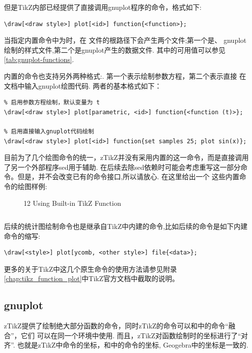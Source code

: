 但是TikZ内部已经提供了直接调用gnuplot程序的命令，格式如下:
\begin{verbatim}
\draw[<draw style>] plot[<id>] function{<function>};
\end{verbatim}

当指定内置命令中为时，在 文件的根路径下会产生两个文件;第一个是、
gnuplot绘制的样式文件,第二个是gnuplot产生的数据文件.
其中的可用值可以参见\cref{tab:gnuplot-functions}. 

内置的命令也支持另外两种格式:. 第一个表示绘制参数方程，第二个表示直接
在文档中输入gnuplot绘图代码. 两者的基本格式如下：
\begin{verbatim}
% 启用参数方程绘制，默认变量为 t
\draw[<draw style>] plot[parametric, <id>] function{<function (t)>};

% 启用直接输入gnuplot代码绘制
\draw[<draw style>] plot[<id>] function{set samples 25; plot sin(x)};
\end{verbatim}

目前为了几个绘图命令的统一，zTikZ并没有采用内置的这一命令，而是直接调用了另一个外部程序sed用于辅助.
在后续去除sed依赖时可能会考虑重写这一部分命令。但是，并不会改变已有的命令接口,所以请放心. 在这里给出一个
这些内置命令的绘图样例:

\begin{figure}[!htb]
    \centering
    
    \caption{12 Using Built-in TikZ Function}
    \label{fig:12-inverse-function-2}
\end{figure}

\inputminted{latex}{./Example/example_12.tex}

后续的统计图绘制命令也是继承自TikZ中内建的命令,比如后续的\cmd{\BarPlot}命令是如下内建命令的缩写:
\begin{verbatim}
\draw[<style>] plot[ycomb, <other style>] file{<data>};
\end{verbatim}

更多的关于TikZ中这几个原生命令的使用方法请参见附录\cref{chap:tikz_function_plot}中TikZ官方文档中截取的说明。

\subsection{gnuplot}
zTikZ提供了绘制绝大部分函数的命令，同时zTikZ的命令可以和中的命令``融合''，它们
可以在同一个环境中使用. 而且，zTikZ对函数绘制时的坐标进行了``对齐''. 
也就是zTikZ中命令的坐标，和中的命令的坐标, Geogebra中的坐标是一致的. 

